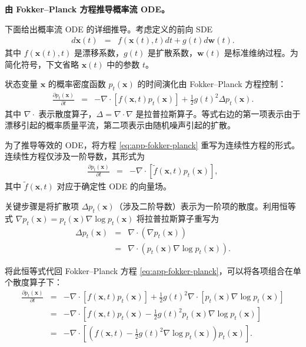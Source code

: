 \textbf{由 Fokker--Planck 方程推导概率流 ODE。}

下面给出概率流 ODE 的详细推导。考虑定义的前向 SDE
\begin{eqnarray}
d\mathbf{x}(t) & = & f(\mathbf{x}(t), t) dt + g(t) d\mathbf{w}(t).
\end{eqnarray}
其中 $f(\mathbf{x}(t), t)$ 是漂移系数，$g(t)$ 是扩散系数，$\mathbf{w}(t)$ 是标准维纳过程。为简化符号，下文省略 $\mathbf{x}(t)$ 中的参数 $t$。

状态变量 $\mathbf{x}$ 的概率密度函数 $p_t(\mathbf{x})$ 的时间演化由 Fokker--Planck 方程控制：
\begin{eqnarray}
\frac{\partial p_t(\mathbf{x})}{\partial t} & = & -\nabla \cdot [f(\mathbf{x}, t) p_t(\mathbf{x})] + \frac{1}{2} g(t)^2 \Delta p_t(\mathbf{x}).
\label{eq:app-fokker-planck}
\end{eqnarray}
其中 $\nabla \cdot$ 表示散度算子，$\Delta = \nabla \cdot \nabla$ 是拉普拉斯算子。等式右边的第一项表示由于漂移引起的概率质量平流，第二项表示由随机噪声引起的扩散。

为了推导等效的 ODE，将方程 \eqref{eq:app-fokker-planck} 重写为连续性方程的形式。连续性方程仅涉及一阶导数，其形式为
\begin{eqnarray}
\frac{\partial p_t(\mathbf{x})}{\partial t} & = & -\nabla \cdot [\tilde{f}(\mathbf{x}, t) p_t(\mathbf{x})],
\label{eq:app-continuity}
\end{eqnarray}
其中 $\tilde{f}(\mathbf{x}, t)$ 对应于确定性 ODE 的向量场。

关键步骤是将扩散项 $\Delta p_t(\mathbf{x})$（涉及二阶导数）表示为一阶项的散度。利用恒等式 $\nabla p_t(\mathbf{x}) = p_t(\mathbf{x}) \nabla \log p_t(\mathbf{x})$ 将拉普拉斯算子重写为
\begin{eqnarray}
\Delta p_t(\mathbf{x}) & = & \nabla \cdot (\nabla p_t(\mathbf{x})) \nonumber \\
& = & \nabla \cdot (p_t(\mathbf{x}) \nabla \log p_t(\mathbf{x})).
\end{eqnarray}

将此恒等式代回 Fokker--Planck 方程 \eqref{eq:app-fokker-planck}，可以将各项组合在单个散度算子下：
\begin{eqnarray}
\frac{\partial p_t(\mathbf{x})}{\partial t} & = & -\nabla \cdot [f(\mathbf{x}, t) p_t(\mathbf{x})] + \frac{1}{2} g(t)^2 \nabla \cdot [p_t(\mathbf{x}) \nabla \log p_t(\mathbf{x})] \nonumber \\
& = & -\nabla \cdot \left[ f(\mathbf{x}, t) p_t(\mathbf{x}) - \frac{1}{2} g(t)^2 p_t(\mathbf{x}) \nabla \log p_t(\mathbf{x}) \right] \nonumber \\
& = & -\nabla \cdot \left[ \left( f(\mathbf{x}, t) - \frac{1}{2} g(t)^2 \nabla \log p_t(\mathbf{x}) \right) p_t(\mathbf{x}) \right].
\end{eqnarray}

